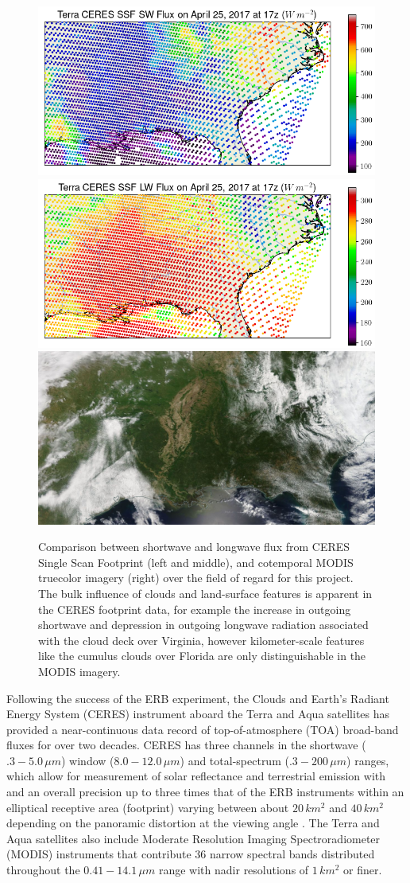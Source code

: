 \documentclass[12pt]{article}
\begin{document}
\begin{figure}[h!]
    \centering

    \includegraphics[width=.33\linewidth]{figs/swflux.png}
    \includegraphics[width=.33\linewidth]{figs/lwflux.png}
    \includegraphics[width=.32\linewidth]{figs/modis.png}

    \caption{Comparison between shortwave and longwave flux from CERES Single Scan Footprint (left and middle), and cotemporal MODIS truecolor imagery (right) over the field of regard for this project. The bulk influence of clouds and land-surface features is apparent in the CERES footprint data, for example the increase in outgoing shortwave and depression in outgoing longwave radiation associated with the cloud deck over Virginia, however kilometer-scale features like the cumulus clouds over Florida are only distinguishable in the MODIS imagery.}
    \label{cover}
\end{figure}

Following the success of the ERB experiment, the Clouds and Earth's Radiant Energy System (CERES) instrument aboard the Terra and Aqua satellites has provided a near-continuous data record of top-of-atmosphere (TOA) broad-band fluxes for over two decades. CERES has three channels in the shortwave ($.3-5.0\,\si{\mu m}$) window ($8.0-12.0\,\si{\mu m}$) and total-spectrum ($.3-200\,\si{\mu m}$) ranges, which allow for measurement of solar reflectance and terrestrial emission with and an overall precision up to three times that of the ERB instruments within an elliptical receptive area (footprint) varying between about $20\,\si{km^2}$ and $40\,\si{km^2}$ depending on the panoramic distortion at the viewing angle \cite{wielicki_clouds_1996}. The Terra and Aqua satellites also include Moderate Resolution Imaging Spectroradiometer (MODIS) instruments that contribute 36 narrow spectral bands distributed throughout the $0.41-14.1\,\si{\mu m}$ range with nadir resolutions of $1\,\si{km^2}$ or finer.
\end{document}
